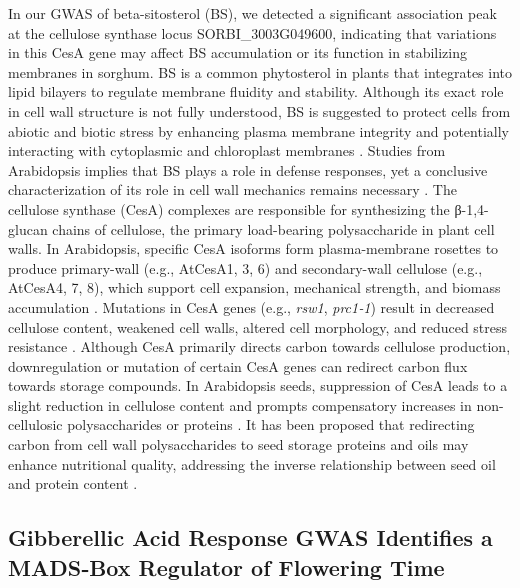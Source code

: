 \documentclass[10pt,letterpaper]{article}
\begin{document}
In our GWAS of beta-sitosterol (BS), we detected a significant association peak at the cellulose synthase locus SORBI\_3003G049600, indicating that variations in this CesA gene may affect BS accumulation or its function in stabilizing membranes in sorghum. BS is a common phytosterol in plants that integrates into lipid bilayers to regulate membrane fluidity and stability. Although its exact role in cell wall structure is not fully understood, BS is suggested to protect cells from abiotic and biotic stress by enhancing plasma membrane integrity and potentially interacting with cytoplasmic and chloroplast membranes \citep{Sayeed2016}. Studies from Arabidopsis implies that BS plays a role in defense responses, yet a conclusive characterization of its role in cell wall mechanics remains necessary \citep{Sayeed2016}. The cellulose synthase (CesA) complexes are responsible for synthesizing the β-1,4-glucan chains of cellulose, the primary load-bearing polysaccharide in plant cell walls. In Arabidopsis, specific CesA isoforms form plasma-membrane rosettes to produce primary-wall (e.g., AtCesA1, 3, 6) and secondary-wall cellulose (e.g., AtCesA4, 7, 8), which support cell expansion, mechanical strength, and biomass accumulation \citep{Mueller1980,Somerville2006,Hu2018}. Mutations in CesA genes (e.g., \emph{rsw1}, \emph{prc1‑1}) result in decreased cellulose content, weakened cell walls, altered cell morphology, and reduced stress resistance \citep{Hu2018,Arioli1998,Persson2007,CanoDelgado2003,HernandezBlanco2007}. Although CesA primarily directs carbon towards cellulose production, downregulation or mutation of certain CesA genes can redirect carbon flux towards storage compounds. In Arabidopsis seeds, suppression of CesA leads to a slight reduction in cellulose content and prompts compensatory increases in non-cellulosic polysaccharides or proteins \citep{Hu2020}. It has been proposed that redirecting carbon from cell wall polysaccharides to seed storage proteins and oils may enhance nutritional quality, addressing the inverse relationship between seed oil and protein content \citep{Tomlinson2004,Ekman2008,Iyer2008,Shi2012,Tan2011,YoshieStark2008,Knowles1983}. 


\subsection*{Gibberellic Acid Response GWAS Identifies a MADS‑Box Regulator of Flowering Time}
\end{document}
